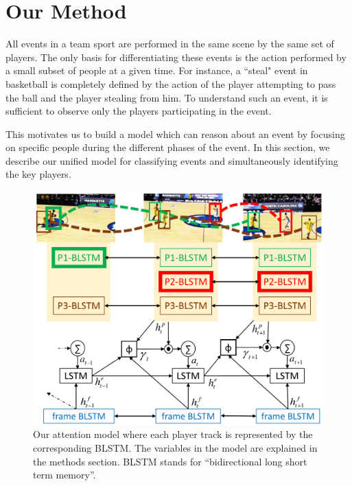 \section{Our Method}
\label{sec:methods}

All events in a team sport are performed in the same scene by the same set
of players. The only basis for differentiating these events is the action
performed by a small subset of people at a given time.  For instance, a
``steal" event in basketball is completely defined by the action of the player attempting to
pass the ball and the player stealing from him.  To understand such an event,
it is sufficient to observe only the players participating in the event.

This motivates us to build a model which can reason about an event by focusing
on specific people during the different phases of the event.
In this section, we describe our unified model for classifying events
and simultaneously identifying the key players.

\begin{figure}[t!]
\begin{center}
    \includegraphics[width=3 in]{images/system_figure_1_cropped_v2.pdf}
\end{center}
   \caption{Our attention model where each player track is represented by the
     corresponding BLSTM. The variables in the model are explained in the
     methods section.  BLSTM stands for ``bidirectional long short term memory''. 
}
\label{fig:model}
\end{figure}

